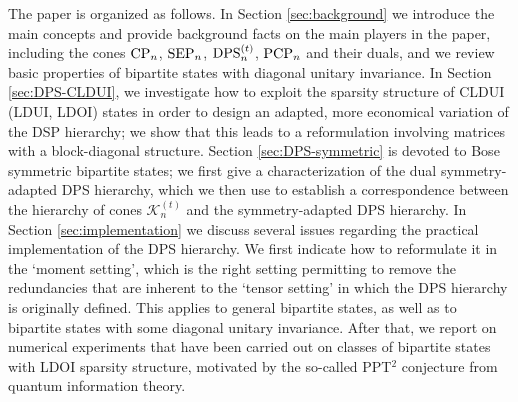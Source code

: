 \documentclass[11pt]{article}
\newcommand{\MK}{{\mathcal K}}
\newcommand{\PCP}{\text{\rm PCP}}
\newcommand{\SEP}{\text{\rm SEP}}
\newcommand{\CP}{\text{\rm CP}}
\newcommand{\DPS}{\text{\rm DPS}}
\theoremstyle{plain}
\begin{document}
\medskip
 The paper is organized as follows. In Section \ref{sec:background} we introduce the main concepts and provide background facts on the main players in the paper, including  the  cones $\CP_n$, $\SEP_n$, $\DPS^{(t)}_n$, $\PCP_n$ and their duals, and we review basic properties of bipartite states with diagonal unitary invariance. In Section \ref{sec:DPS-CLDUI}, we investigate how to exploit the sparsity structure of CLDUI (LDUI, LDOI) states in order to design an adapted, more economical  variation of the DSP hierarchy; we show that this leads to a reformulation involving matrices with a block-diagonal structure. Section \ref{sec:DPS-symmetric} is devoted to Bose symmetric bipartite states; we first give a characterization of the dual symmetry-adapted DPS hierarchy, which we then use to establish a correspondence between the hierarchy of cones $\MK^{(t)}_n$ and the symmetry-adapted DPS hierarchy.
 In Section  \ref{sec:implementation} we discuss several issues regarding the practical implementation of the DPS hierarchy. We first indicate how to reformulate it in the `moment setting', which is the right setting permitting to remove the redundancies that are inherent to the `tensor setting' in which the DPS hierarchy is originally defined. This applies to  general bipartite states, as well as to bipartite states with some diagonal unitary invariance. After that, we report on numerical experiments that have been carried out on classes of bipartite states with LDOI sparsity structure, motivated by the so-called  PPT$^2$ conjecture from quantum information theory.
 
 
 
\end{document}
